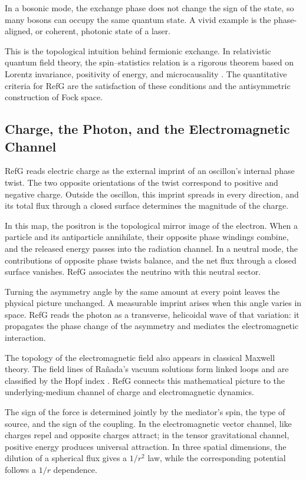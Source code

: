 \documentclass[11pt,a4paper]{article}
\begin{document}
In a bosonic mode, the exchange phase does not change the sign of the state, so many bosons can occupy the same quantum state. A vivid example is the phase-aligned, or coherent, photonic state of a laser.

This is the topological intuition behind fermionic exchange. In relativistic quantum field theory, the spin--statistics relation is a rigorous theorem based on Lorentz invariance, positivity of energy, and microcausality \citep{pauli1940}. The quantitative criteria for RefG are the satisfaction of these conditions and the antisymmetric construction of Fock space.

\subsection{Charge, the Photon, and the Electromagnetic Channel}

RefG reads electric charge as the external imprint of an oscillon's internal phase twist. The two opposite orientations of the twist correspond to positive and negative charge. Outside the oscillon, this imprint spreads in every direction, and its total flux through a closed surface determines the magnitude of the charge.

In this map, the positron is the topological mirror image of the electron. When a particle and its antiparticle annihilate, their opposite phase windings combine, and the released energy passes into the radiation channel. In a neutral mode, the contributions of opposite phase twists balance, and the net flux through a closed surface vanishes. RefG associates the neutrino with this neutral sector.

Turning the asymmetry angle by the same amount at every point leaves the physical picture unchanged. A measurable imprint arises when this angle varies in space. RefG reads the photon as a transverse, helicoidal wave of that variation: it propagates the phase change of the asymmetry and mediates the electromagnetic interaction.

The topology of the electromagnetic field also appears in classical Maxwell theory. The field lines of Rañada's vacuum solutions form linked loops and are classified by the Hopf index \citep{ranada1989}. RefG connects this mathematical picture to the underlying-medium channel of charge and electromagnetic dynamics.

The sign of the force is determined jointly by the mediator's spin, the type of source, and the sign of the coupling. In the electromagnetic vector channel, like charges repel and opposite charges attract; in the tensor gravitational channel, positive energy produces universal attraction. In three spatial dimensions, the dilution of a spherical flux gives a $1/r^2$ law, while the corresponding potential follows a $1/r$ dependence.
\end{document}
